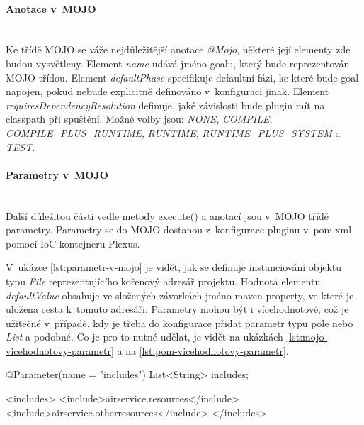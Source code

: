 \documentclass[11pt,twoside,a4paper]{book}
\begin{document}
\paragraph{Anotace v~MOJO}
\mbox{}\\

Ke třídě MOJO se váže nejdůležitější anotace {\em @Mojo}, některé její elementy
zde budou vysvětleny. Element {\em name} udává jméno goalu, který bude
reprezentován MOJO třídou.
Element {\em defaultPhase} specifikuje defaultní fázi, ke které bude goal
napojen, pokud nebude explicitně definováno v~konfiguraci jinak. Element
{\em requiresDependencyResolution} definuje, jaké závislosti bude plugin mít na
classpath při spuštění. Možné volby jsou: {\em NONE}, {\em COMPILE},
{\em COMPILE\_PLUS\_RUNTIME}, {\em RUNTIME}, {\em RUNTIME\_PLUS\_SYSTEM} a {\em
TEST}.

\paragraph{Parametry v~MOJO}
\mbox{}\\

Další důležitou částí vedle metody execute() a anotací jsou v~MOJO třídě parametry. Parametry
se do MOJO dostanou z~konfigurace pluginu v~pom.xml pomocí IoC kontejneru Plexus.


V~ukázce \ref{lst:parametr-v-mojo} je vidět, jak se definuje instanciování
objektu typu {\em File} reprezentujícího kořenový adresář projektu. Hodnota
elementu {\em defaultValue} obsahuje ve složených závorkách jméno maven
property, ve které je uložena cesta k~tomuto adresáři. Parametry mohou být i
vícehodnotové, což je užitečné v~případě, kdy je třeba do konfigurace přidat
parametr typu pole nebo {\em List} a podobné. Co je pro to nutné udělat, je
vidět na ukázkách \ref{lst:mojo-vicehodnotovy-parametr} a na
\ref{lst:pom-vicehodnotovy-parametr}.

\begin{code}[frame=single,caption={Definice vícehodnotového parametru
v~Mojo},label={lst:mojo-vicehodnotovy-parametr}] 
@Parameter(name = "includes")
List<String> includes;
\end{code}

\begin{code}[frame=single,caption={Konfigurace vícehodnotového parametru
v~pom.xml},label={lst:pom-vicehodnotovy-parametr}] 
<includes>
    <include>airservice.resources</include>
    <include>airservice.otherresources</include>
</includes>
\end{code}
\end{document}

